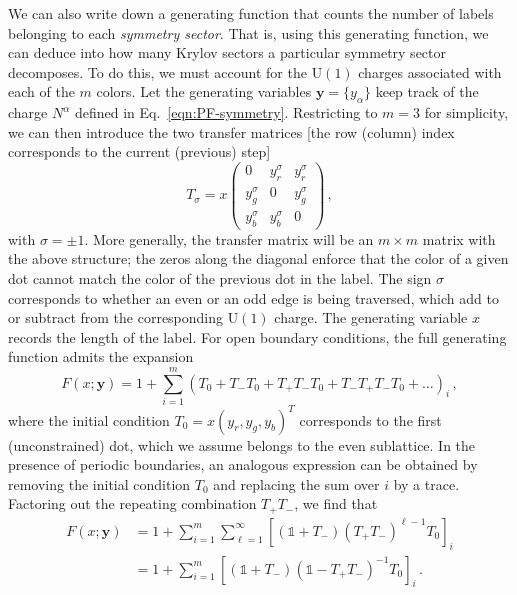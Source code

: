We can also write down a generating function that counts the number of labels belonging to each \emph{symmetry sector}. That is, using this generating function, we can deduce into how many Krylov sectors a particular symmetry sector decomposes.
To do this, we must account for the $\text{U}(1)$ charges associated with each of the $m$ colors. Let the generating variables $\mathbf{y} = \{ y_\alpha \}$ keep track of the charge $N^\alpha$ defined in Eq.~\eqref{eqn:PF-symmetry}. Restricting to $m=3$ for simplicity, we can then introduce the two transfer matrices [the row (column) index corresponds to the current (previous) step]
%
%
\begin{equation}
    T_\sigma = 
    x
    \begin{pmatrix}
        0 & y_r^{\sigma} & y_r^{\sigma} \\
        y_g^{\sigma} & 0 & y_g^{\sigma} \\
        y_b^{\sigma} & y_b^{\sigma} & 0
    \end{pmatrix}
    \, ,
\end{equation}
%
%
with $\sigma = \pm 1$. More generally, the transfer matrix will be an $m\times m$ matrix with the above structure; the zeros along the diagonal enforce that the color of a given dot cannot match the color of the previous dot in the label. The sign $\sigma$ corresponds to whether an even or an odd edge is being traversed, which add to or subtract from the corresponding $\text{U}(1)$ charge.
The generating variable $x$ records the length of the label.
For open boundary conditions, the full generating function admits the expansion 
%
%
\begin{equation}
    F(x; \mathbf{y} ) = 1 + \sum_{i=1}^{m} \left( T_0 + T_- T_0 + T_+T_- T_0 + T_-T_+T_-T_0 + \dots \right)_i
    \, ,
\end{equation}
%
%
where the initial condition $T_0 = x(y_r, y_g, y_b)^T$ corresponds to the first (unconstrained) dot, which we assume belongs to the even sublattice.
In the presence of periodic boundaries, an analogous expression can be obtained by removing the initial condition $T_0$ and replacing the sum over $i$ by a trace.
Factoring out the repeating combination $T_+ T_-$, we find that
%
%
\begin{subequations}
\begin{align}
    F(x; \mathbf{y} ) &= 1 + \sum_{i=1}^m \sum_{\ell=1}^{\infty} [(\mathds{1}+T_-)(T_+T_-)^{\ell - 1}T_0]_{i}  \\
                      &= 1 + \sum_{i=1}^m [(\mathds{1}+T_-)(\mathds{1}-T_+T_-)^{-1} T_0]_{i} \label{eqn:U(1)-GF-matrixinverse}
                      \, .
\end{align}%
\end{subequations}
